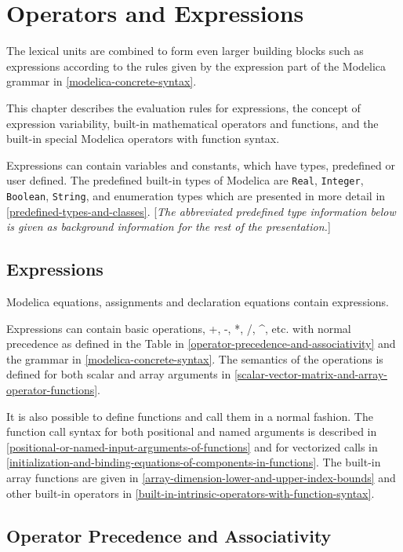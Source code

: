 \chapter{Operators and Expressions}

The lexical units are combined to form even larger building blocks such
as expressions according to the rules given by the expression part of
the Modelica grammar in \autoref{modelica-concrete-syntax}.

This chapter describes the evaluation rules for expressions, the concept
of expression variability, built-in mathematical operators and
functions, and the built-in special Modelica operators with function
syntax.

Expressions can contain variables and constants, which have types,
predefined or user defined. The predefined built-in types of Modelica
are \lstinline!Real!, \lstinline!Integer!, \lstinline!Boolean!, \lstinline!String!, and enumeration types which are
presented in more detail in \autoref{predefined-types-and-classes}. {[}\emph{The abbreviated
predefined type information below is given as background information for
the rest of the presentation.}{]}

\section{Expressions}

Modelica equations, assignments and declaration equations contain
expressions.

Expressions can contain basic operations, +, -, *, /, \^{}, etc. with
normal precedence as defined in the Table in \autoref{operator-precedence-and-associativity} and the grammar
in \autoref{modelica-concrete-syntax}. The semantics of the operations is defined for both
scalar and array arguments in \autoref{scalar-vector-matrix-and-array-operator-functions}.

It is also possible to define functions and call them in a normal
fashion. The function call syntax for both positional and named
arguments is described in \autoref{positional-or-named-input-arguments-of-functions} and for vectorized calls in
\autoref{initialization-and-binding-equations-of-components-in-functions}. The built-in array functions are given in \autoref{array-dimension-lower-and-upper-index-bounds}
and other built-in operators in \autoref{built-in-intrinsic-operators-with-function-syntax}.

\section{Operator Precedence and Associativity}

